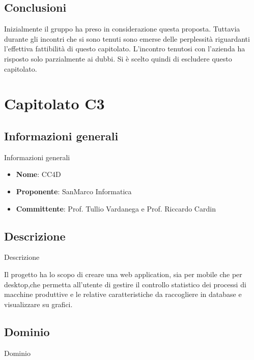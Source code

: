 \documentclass[11pt]{article}
\begin{document}
    \subsection{Conclusioni}
    
    Inizialmente il gruppo ha preso in considerazione questa proposta. Tuttavia durante gli incontri che si sono tenuti sono emerse delle perplessità riguardanti l’effettiva fattibilità di questo capitolato. L’incontro tenutosi con l’azienda ha risposto solo parzialmente ai dubbi. Si è scelto quindi di escludere questo capitolato.
    
    
    
    
    
    
    
    
    
    
    
    
    
    
    
    
    
    
    
    
    
\section{Capitolato C3}
    \subsection{Informazioni generali} Informazioni generali
    \begin{itemize}
        \item \textbf{Nome}: CC4D
        \item \textbf{Proponente}: SanMarco Informatica
        \item \textbf{Committente}: Prof. Tullio Vardanega e Prof. Riccardo Cardin
    \end{itemize}
    \subsection{Descrizione} Descrizione
    
    Il progetto ha lo scopo di creare una web application, sia per mobile che per desktop,che
    permetta all’utente di gestire il controllo statistico dei processi di macchine produttive e 
    le relative caratteristiche da raccogliere in database e visualizzare su grafici.
    
    \subsection{Dominio} Dominio
\end{document}

